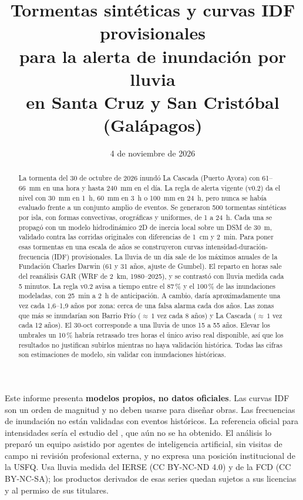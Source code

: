 \documentclass{sosg-informe}
\title{Tormentas sintéticas y curvas IDF provisionales\\para la alerta de inundación por lluvia\\en Santa Cruz y San Cristóbal (Galápagos)}
\date{4 de noviembre de 2026}
\begin{document}
\maketitle

\begin{abstract}
La tormenta del 30 de octubre de 2026 inundó La Cascada (Puerto Ayora) con 61--66~mm en una hora y hasta 240~mm en el día. La regla de alerta vigente (v0.2) da el nivel \alto{} con 30~mm en 1~h, 60~mm en 3~h o 100~mm en 24~h, pero nunca se había evaluado frente a un conjunto amplio de eventos. Se generaron 500 tormentas sintéticas por isla, con formas convectivas, orográficas y uniformes, de 1 a 24~h. Cada una se propagó con un modelo hidrodinámico 2D de inercia local sobre un DSM de 30~m, validado contra las corridas originales con diferencias de 1~cm y 2~min. Para poner esas tormentas en una escala de años se construyeron curvas intensidad-duración-frecuencia (IDF) provisionales. La lluvia de un día sale de los máximos anuales de la Fundación Charles Darwin (61 y 31 años, ajuste de Gumbel). El reparto en horas sale del reanálisis GAR (WRF de 2~km, 1980--2025), y se contrastó con lluvia medida cada 5 minutos. La regla v0.2 avisa a tiempo entre el 87\,\% y el 100\,\% de las inundaciones modeladas, con 25~min a 2~h de anticipación. A cambio, daría \alto{} aproximadamente una vez cada 1,6--1,9 años por zona: cerca de una falsa alarma cada dos años. Las zonas que más se inundarían son Barrio Frío (${\approx}\,1$ vez cada 8 años) y La Cascada (${\approx}\,1$ vez cada 12 años). El 30-oct corresponde a una lluvia de unos 15 a 55 años. Elevar los umbrales un 10\,\% habría retrasado tres horas el único aviso real disponible, así que los resultados no justifican subirlos mientras no haya validación histórica. Todas las cifras son estimaciones de modelo, sin validar con inundaciones históricas.
\end{abstract}

\begin{aviso}
Este informe presenta \textbf{modelos propios, no datos oficiales}. Las curvas IDF son un orden de magnitud y no deben usarse para diseñar obras. Las frecuencias de inundación no están validadas con eventos históricos. La referencia oficial para intensidades sería el estudio del \citet{inamhi2015}, que aún no se ha obtenido. El análisis lo preparó un equipo asistido por agentes de inteligencia artificial, sin visitas de campo ni revisión profesional externa, y no expresa una posición institucional de la USFQ. Usa lluvia medida del IERSE (CC BY-NC-ND 4.0) y de la FCD (CC BY-NC-SA); los productos derivados de esas series quedan sujetos a sus licencias y al permiso de sus titulares.
\end{aviso}
\end{document}
